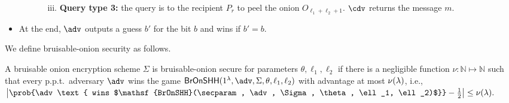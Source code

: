 \documentclass[runningheads,a4paper]{llncs}
\begin{document}
\begin{itemize}
\begin{enumerate}[resume]
\begin{enumerate}
    \item[iii.] \textbf{Query type 3:} the query is to the recipient $P_r$ to peel the onion $O_{\ell_1 + \ell_2 +1}$.  $\cdv$ returns the message $m$. 
\end{enumerate}

\end{enumerate}
\item At the end, $\adv$ outputs a guess $b'$ for the bit $b$ and wins if $b'=b$. 

\end{itemize}


We define bruisable-onion security as follows.  
\begin{definition}\label{def:secure}
A bruisable onion encryption scheme $\Sigma$ is bruisable-onion secure for parameters $\theta, \ell_1, \ell_2$ if there is a negligible function $\nu : \mathbb{N}\mapsto \mathbb{N}$ such that every p.p.t.\ adversary $\adv$ wins the game $\mathsf{BrOnSHH}(\secparam, \adv, \Sigma, \theta, \ell_1, \ell_2)$ with advantage at most $\nu(\lambda)$, i.e., 
$
\left| \prob{\adv \text{ wins $\mathsf{BrOnSHH}(\secparam, \adv, \Sigma, %
\theta, \ell_1, \ell_2)$}} - \frac{1}{2} \right| \le \nu(\secpar) .
$
\end{definition}
\end{document}

